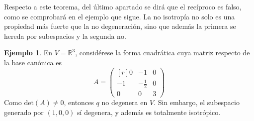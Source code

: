 \documentclass[12pt]{report}
\theoremstyle{definition}
\theoremstyle{definition}
\newtheorem{example}{Ejemplo}[chapter]
\theoremstyle{remark}
\newcommand{\R}{\mathbb R}
\begin{document}
Respecto a este teorema, del último apartado se dirá que el recíproco es falso, como se comprobará en el ejemplo que sigue. La no isotropía no solo es una propiedad más fuerte que la no degeneración, sino que además la primera se hereda por subespacios y la segunda no.

\begin{example}
En $V = \R^3$, considérese la forma cuadrática cuya matriz respecto de la base canónica es
\[A = \begin{pmatrix*}[r]
    0 & -1 & 0 \\
    -1 & -\frac{1}{2} & 0 \\
    0 & 0 & 3
\end{pmatrix*}\]
Como $\textrm{det}(A) \neq 0$, entonces $q$ no degenera en $V$. Sin embargo, el subespacio generado por $(1,0,0)$ sí degenera, y además es totalmente isotrópico.

\end{example}
\end{document}
